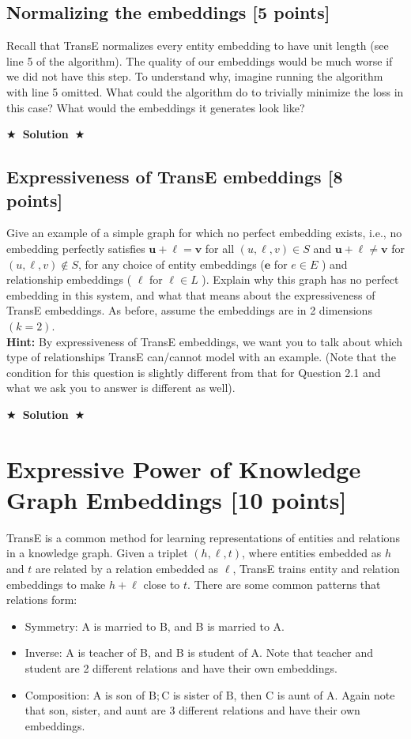 \documentclass[11pt]{article}
\numberwithin{figure}{section}
\newcommand{\Solution}[1]{{\medskip \color{red} \bf $\bigstar$~\sf \textbf{Solution}~$\bigstar$ \sf #1 } \bigskip}
\begin{document}
\subsection{ Normalizing the embeddings [5 points]}
Recall that TransE normalizes every entity embedding to have unit length (see line 5 of the algorithm). The quality of our embeddings would be much worse if we did not have this step. To understand why, imagine running the algorithm with line 5 omitted.
What could the algorithm do to trivially minimize the loss in this case? What would the embeddings
it generates look like?

\Solution{}

\subsection{Expressiveness of TransE embeddings [8 points]}
Give an example of a simple graph for which no perfect embedding exists, i.e., no embedding perfectly satisfies $\mathbf{u}+\boldsymbol{\ell}=\mathbf{v}$ for all $(u, \ell, v) \in S$ and $\mathbf{u}+\boldsymbol{\ell} \neq \mathbf{v}$ for $(u, \ell, v) \notin S$, for any choice of entity embeddings ($\mathbf{e}$ for $e \in E$ ) and relationship embeddings ( $\boldsymbol{\ell}$ for $\ell \in L$ ). Explain why this graph has no perfect embedding in this system, and what that means about the expressiveness of TransE embeddings. As before, assume the embeddings are in 2 dimensions $(k=2)$.\\
\textbf{Hint: }By expressiveness of TransE embeddings, we want you to talk about which type of relationships TransE can/cannot model with an example. (Note that the condition for this question is slightly different from that for Question 2.1 and what we ask you to answer is different as well).

\Solution{}

\newpage

\section{Expressive Power of Knowledge Graph Embeddings [10 points]}
TransE is a common method for learning representations of entities and relations in a knowledge graph. Given a triplet $(h, \ell, t)$, where entities embedded as $h$ and $t$ are related by a relation embedded as $\ell$, TransE trains entity and relation embeddings to make $h+\ell$ close to $t$. There are some common patterns that relations form:
\begin{itemize}
    \item Symmetry: A is married to B, and B is married to A.
    \item Inverse: A is teacher of B, and B is student of A. Note that teacher and student are 2 different relations and have their own embeddings.
    \item Composition: $\mathrm{A}$ is son of $\mathrm{B} ; \mathrm{C}$ is sister of $\mathrm{B}$, then $\mathrm{C}$ is aunt of $\mathrm{A}$. Again note that son, sister, and aunt are 3 different relations and have their own embeddings.
\end{itemize}
\end{document}
